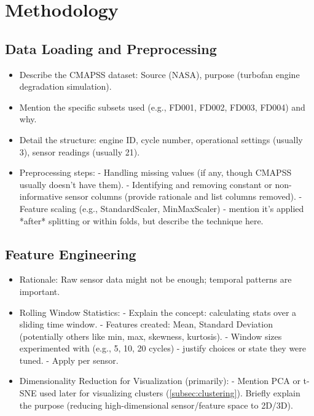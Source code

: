 \section{Methodology}
\label{sec:methodology}



\subsection{Data Loading and Preprocessing}
\label{subsec:data_preprocessing}
\begin{itemize}
    \item Describe the CMAPSS dataset: Source (NASA), purpose (turbofan engine degradation simulation).
    \item Mention the specific subsets used (e.g., FD001, FD002, FD003, FD004) and why.
    \item Detail the structure: engine ID, cycle number, operational settings (usually 3), sensor readings (usually 21).
    \item Preprocessing steps:
        - Handling missing values (if any, though CMAPSS usually doesn't have them).
        - Identifying and removing constant or non-informative sensor columns (provide rationale and list columns removed).
        - Feature scaling (e.g., StandardScaler, MinMaxScaler) - mention it's applied *after* splitting or within folds, but describe the technique here.
\end{itemize}

\subsection{Feature Engineering}
\label{subsec:feature_engineering}
\begin{itemize}
    \item Rationale: Raw sensor data might not be enough; temporal patterns are important.
    \item Rolling Window Statistics:
        - Explain the concept: calculating stats over a sliding time window.
        - Features created: Mean, Standard Deviation (potentially others like min, max, skewness, kurtosis).
        - Window sizes experimented with (e.g., 5, 10, 20 cycles) - justify choices or state they were tuned.
        - Apply per sensor.
    \item Dimensionality Reduction for Visualization (primarily):
        - Mention PCA or t-SNE used later for visualizing clusters (\cref{subsec:clustering}). Briefly explain the purpose (reducing high-dimensional sensor/feature space to 2D/3D).
\end{itemize}


